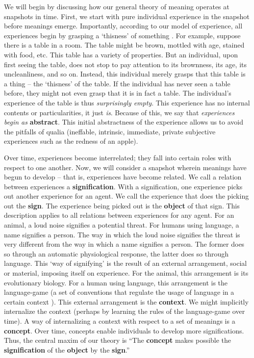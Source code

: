 We will begin by discussing how our general theory of meaning operates at snapshots in time.
First, we start with pure individual experience in the snapshot before meanings emerge.
Importantly, according to our model of experience, all experiences begin by grasping a `thisness' of something \citep{Hegel:PhG}.
For example, suppose there is a table in a room.
The table might be brown, mottled with age, stained with food, etc.
This table has a variety of properties.
But an individual, upon first seeing the table, does not stop to pay attention to its brownness, its age, its uncleanliness, and so on.
Instead, this individual merely grasps that this table is a thing -- the `thisness' of the table.
If the individual has never seen a table before, they might not even grasp that it is in fact a table.
The individual's experience of the table is thus \textit{surprisingly empty}.
This experience has no internal contents or particularities, it just \textit{is}.
Because of this, we say that \textit{experiences begin as }\textbf{abstract}.
This initial abstractness of the experience allows us to avoid the pitfalls of qualia (ineffable, intrinsic, immediate, private \citep{Dennett:QuiningQualia} subjective experiences such as the redness of an apple).

Over time, experiences become interrelated; they fall into certain roles with respect to one another.
Now, we will consider a snapshot wherein meanings have begun to develop -- that is, experiences have become related.
We call a relation between experiences a \textbf{signification}.
With a signification, one experience picks out another experience for an agent.
We call the experience that does the picking out the \textbf{sign}.
The experience being picked out is the \textbf{object} of that sign.
This description applies to all relations between experiences for any agent.
For an animal, a loud noise signifies a potential threat.
For humans using language, a name signifies a person.
The way in which the loud noise signifies the threat is very different from the way in which a name signifies a person.
The former does so through an automatic physiological response, the latter does so through language.
This `way of signifying' is the result of an external arrangement, social or material, imposing itself on experience.
For the animal, this arrangement is its evolutionary biology.
For a human using language, this arrangement is the language-game (a set of conventions that regulate the usage of language in a certain context \citep{Wittgenstein:PhilosophicalInvestigations}). 
This external arrangement is the \textbf{context}.
We might implicitly internalize the context (perhaps by learning the rules of the language-game over time).
A way of internalizing a context with respect to a set of meanings is a \textbf{concept}.
Over time, concepts enable individuals to develop more significations.
Thus, the central maxim of our theory is ``The \textbf{concept} makes possible the \textbf{signification} of the \textbf{object} by the \textbf{sign}.''

